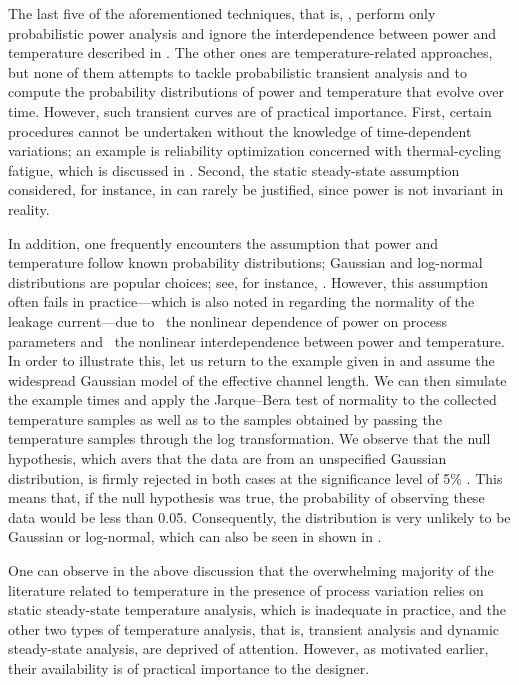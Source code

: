 The last five of the aforementioned techniques, that is, \cite{bhardwaj2006,
vrudhula2006, ghanta2006, bhardwaj2008, shen2009}, perform only probabilistic
power analysis and ignore the interdependence between power and temperature
described in . The other ones are temperature-related
approaches, but none of them attempts to tackle probabilistic transient analysis
and to compute the probability distributions of power and temperature that
evolve over time. However, such transient curves are of practical importance.
First, certain procedures cannot be undertaken without the knowledge of
time-dependent variations; an example is reliability optimization concerned with
thermal-cycling fatigue, which is discussed in .
Second, the static steady-state assumption considered, for instance, in
\cite{huang2009a, juan2011, juan2012, lee2013} can rarely be justified, since
power is not invariant in reality.

In addition, one frequently encounters the assumption that power and temperature
follow \apriori known probability distributions; Gaussian and log-normal
distributions are popular choices; see, for instance, \cite{bhardwaj2006,
srivastava2010, juan2012}. However, this assumption often fails in
practice---which is also noted in \cite{juan2012} regarding the normality of the
leakage current---due to \one~the nonlinear dependence of power on process
parameters and \two~the nonlinear interdependence between power and temperature.
In order to illustrate this, let us return to the example given in
 and assume the widespread Gaussian model of the
effective channel length. We can then simulate the example  times
and apply the Jarque--Bera test of normality to the collected temperature
samples as well as to the samples obtained by passing the temperature samples
through the log transformation. We observe that the null hypothesis, which avers
that the data are from an unspecified Gaussian distribution, is firmly rejected
in both cases at the significance level of 5\% \cite{rao2002}. This means that,
if the null hypothesis was true, the probability of observing these data would
be less than 0.05. Consequently, the distribution is very unlikely to be
Gaussian or log-normal, which can also be seen in
 shown in .

One can observe in the above discussion that the overwhelming majority of the
literature related to temperature in the presence of process variation relies on
static steady-state temperature analysis, which is inadequate in practice, and
the other two types of temperature analysis, that is, transient analysis and
dynamic steady-state analysis, are deprived of attention. However, as motivated
earlier, their availability is of practical importance to the designer.

